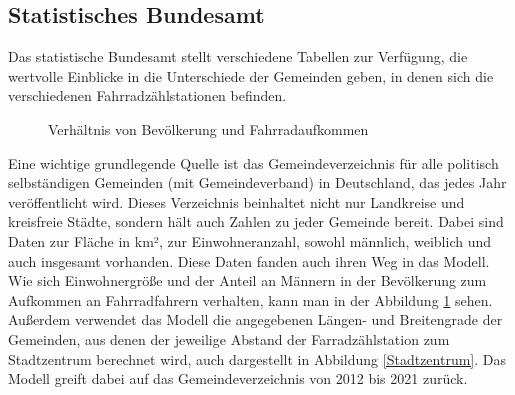 \documentclass[a4paper,12pt]{thesis}
\begin{document}
\subsection{Statistisches Bundesamt}

Das statistische Bundesamt stellt verschiedene Tabellen zur Verfügung, die wertvolle Einblicke in die Unterschiede der Gemeinden geben, in denen sich die verschiedenen Fahrradzählstationen befinden.\\

\begin{figure}%
	\centering
	\qquad
	\caption{Verhältnis von Bevölkerung und Fahrradaufkommen}%
	\label{fig:Gemeindevz}%
\end{figure}

Eine wichtige grundlegende Quelle ist das Gemeindeverzeichnis für alle politisch selbständigen Gemeinden (mit Gemeindeverband) in Deutschland, das jedes Jahr veröffentlicht wird. Dieses Verzeichnis beinhaltet nicht nur Landkreise und kreisfreie Städte, sondern hält auch Zahlen zu jeder Gemeinde bereit. Dabei sind Daten zur Fläche in km², zur Einwohneranzahl, sowohl männlich, weiblich und auch insgesamt vorhanden. Diese Daten fanden auch ihren Weg in das Modell. Wie sich Einwohnergröße und der Anteil an Männern in der Bevölkerung zum Aufkommen an Fahrradfahrern verhalten, kann man in der Abbildung \ref{fig:Gemeindevz} sehen. Außerdem verwendet das Modell die angegebenen Längen- und Breitengrade der Gemeinden, aus denen der jeweilige Abstand der Farradzählstation zum Stadtzentrum berechnet wird, auch dargestellt in Abbildung \ref{Stadtzentrum}. Das Modell greift dabei auf das Gemeindeverzeichnis von 2012 bis 2021 zurück.\\
\end{document}
